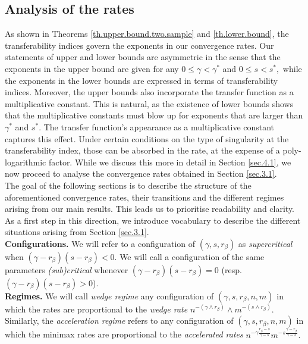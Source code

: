 \documentclass[10pt]{article}
\begin{document}
\subsection{Analysis of the rates}
\label{sec.3.2}

As shown in Theorems \ref{th.upper.bound.two.sample} and \ref{th.lower.bound}, the transferability indices govern the exponents in our convergence rates. Our statements of upper and lower bounds are asymmetric in the sense that the exponents in the upper bound are given for any $0 \leq \gamma < \gamma^*$ and  $0\leq s < s^*,$ while the exponents in the lower bounds are expressed in terms of transferability indices. Moreover, the upper bounds also incorporate the transfer function as a multiplicative constant. This is natural, as the existence of lower bounds shows that the multiplicative constants must blow up for exponents that are larger than $\gamma^*$ and $s^*$. The transfer function's appearance as a multiplicative constant captures this effect. Under certain conditions on the type of singularity at the transferability index, those can be absorbed in the rate, at the expense of a poly-logarithmic factor. While we discuss this more in detail in Section \ref{sec.4.1}, we now proceed to analyse the convergence rates obtained in Section \ref{sec.3.1}.\\

The goal of the following sections is to describe the structure of the aforementioned convergence rates, their transitions and the different regimes arising from our main results. This leads us to prioritise readability and clarity. As a first step in this direction, we introduce vocabulary to describe the different situations arising from Section \ref{sec.3.1}. \\

\noindent\textbf{Configurations.} We will refer to a configuration of $(\gamma, s, r_\beta)$ as \textit{supercritical} when $(\gamma - r_\beta)(s - r_\beta) < 0.$ We will call a configuration of the same parameters \textit{(sub)critical} whenever $(\gamma - r_\beta)(s - r_\beta) = 0$ (resp.\ $(\gamma - r_\beta)(s - r_\beta) > 0$).\\

\noindent\textbf{Regimes.} We will call \textit{wedge regime} any configuration of $(\gamma, s, r_\beta, n, m)$ in which the rates are proportional to the \textit{wedge rate} $n^{-(\gamma\wedge r_\beta)} \wedge m^{-(s\wedge r_\beta)}.$ Similarly, the \textit{acceleration regime} refers to any configuration of $(\gamma, s, r_\beta, n, m)$ in which the minimax rates are proportional to the \textit{accelerated rates} $n^{-\gamma\tfrac{r_\beta - s}{\gamma - s}}m^{-s\tfrac{\gamma - r_\beta}{\gamma - s}}.$\\
\end{document}
